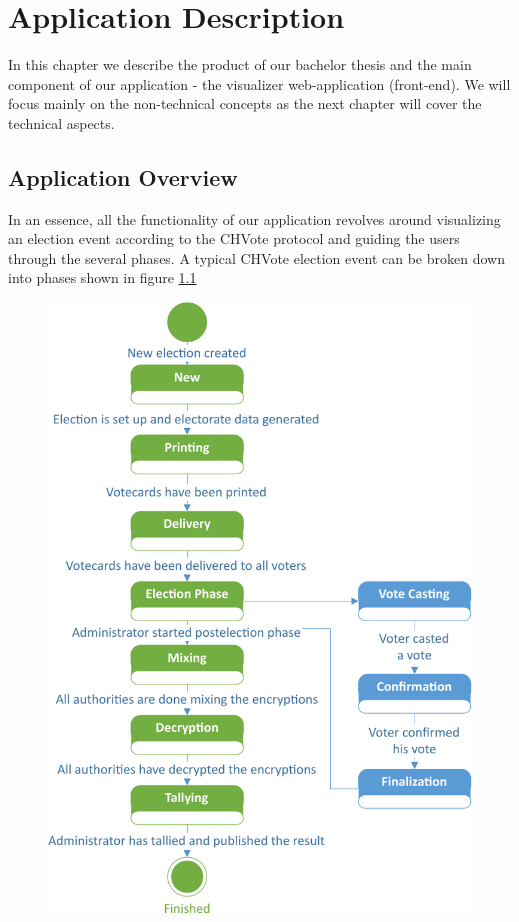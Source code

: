 \chapter{Application Description}
In this chapter we describe the product of our bachelor thesis and the main component of our application - the visualizer web-application (front-end). We will focus mainly on the non-technical concepts as the next chapter will cover the technical aspects.

\section{Application Overview}
In an essence, all the functionality of our application revolves around visualizing an election event according to the CHVote protocol and guiding the users through the several phases. A typical CHVote election event can be broken down into phases shown in figure \ref{Phases of an election-event}

\begin{figure}
\begin{center}
\includegraphics[scale=0.65]{assets/electionStatediagram.pdf}
\label{Phases of an election-event}%
\end{center}
\end{figure}

